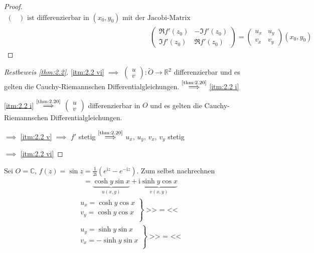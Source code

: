 \documentclass[a4paper,10pt]{scrbook}
\begin{document}
\begin{theorem}[Satz]
\begin{proof}
\begin{align*}
\begin{pmatrix}
      \end{pmatrix}
      \text{ ist differenzierbar in } (x_0,y_0) \text{ mit der Jacobi-Matrix} \\
      &\phantom{\iff\quad}
      \begin{pmatrix}
        \Re f'(z_0) & -\Im f'(z_0) \\
        \Im f'(z_0) & \Re f'(z_0)
      \end{pmatrix}
      =
      \begin{pmatrix}
        u_x & u_y \\
        v_x & v_y
      \end{pmatrix}
      (x_0,y_0)
    \end{align*}
  \end{proof}
\end{theorem}

\begin{proof}[Restbeweis \ref{thm:2.2}]
  \ref{itm:2.2 vi} $\implies$ $\begin{pmatrix} u \\ v \end{pmatrix} : \widetilde{O} \to \mathbb{R}^2$ differenzierbar und es gelten die Cauchy-Riemannschen Differentialgleichungen. $\overset{\text{\ref{thm:2.20}}}{\implies}$ \ref{itm:2.2 i}

  \ref{itm:2.2 i} $\overset{\text{\ref{thm:2.20}}}{\implies}$ $\begin{pmatrix} u \\ v \end{pmatrix}$ differenzierbar in $O$ und es gelten die Cauchy-Riemannschen Differentialgleichungen.

  $\implies$ \ref{itm:2.2 v} $\implies$ $f'$ stetig $\overset{\text{\ref{thm:2.20}}}{\implies}$ $u_x$, $u_y$, $v_x$, $v_y$ stetig

  $\implies$ \ref{itm:2.2 vi}
\end{proof}

\begin{example}
  Sei $O = \mathbb{C}$, $f(z) = \sin z = \frac{1}{2 \mathrm{i}} \left( e^{\mathrm{i} z} - e^{-\mathrm{i} z} \right)$. Zum selbst nachrechnen
  \begin{align*}
    = \underbrace{\cosh y \sin x}_{u(x,y)} + \mathrm{i} \underbrace{\sinh y \cos x}_{v(x,y)}
  \end{align*}
  \begin{align*}
    \left.
    \begin{matrix}
      u_x = \cosh y \cos x \\
      v_y = \cosh y \cos x \\
    \end{matrix}
    \right\} \text{>> $=$ <<}
    \\
    \left.
    \begin{matrix}
      u_y = \sinh y \sin x \\
      v_x = - \sinh y \sin x \\
    \end{matrix}
    \right\} \text{>> $=$ <<}
  \end{align*}
\end{example}
\end{document}
